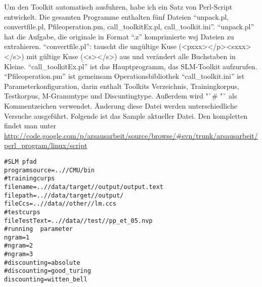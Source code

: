 
Um den Toolkit automatisch ausfuhren, habe ich ein Satz von Perl-Script entwickelt. 
Die gesamten Programme enthalten f\"unf Dateien "`unpack.pl, convertfile.pl, Pfileoperation.pm, call\_toolkitEx.pl, call\_toolkit.ini"'.
"`unpack.pl"' hat die Aufgabe, die originale in Format "`.z"' komprimierte  wsj Dateien zu extrahieren.
"`convertfile.pl"': tauscht die ung\"ultige Kuse (<pxxx></p><sxxx></s>) mit g\"ultige Kuse (<s></s>) aus und ver\"andert alle Buchstaben in Kleine. 
"`call\_toolkitEx.pl"' ist das Hauptprogramm, das SLM-Toolkit aufzurufen. 
"`Pfileoperation.pm"' ist gemeinsam Operationsbibliothek
"`call\_toolkit.ini"' ist Parameterkonfiguration, darin enthalt Toolkits Verzeichnis, Trainingkorpus, Testkorpus, M-Grammtype und Discuntingtype. Au\ss erdem wird  "`\# "`  als Kommentzeichen verwendet. \"Anderung diese Datei werden unterschiedliche Versuche ausgef\"uhrt. Folgende ist das Sample aktueller Datei. Den kompletten findet man unter \url{http://code.google.com/p/arsausarbeit/source/browse/#svn/trunk/arsausarbeit/perl_program/linux/script}\\

\begin{lstlisting}
#SLM pfad 
programsource=..//CMU/bin 
#trainingcurps 
filename=..//data/target//output/output.text 
filepath=..//data/target//output/ 
fileCcs=..//data//other//lm.ccs 
#testcurps 
fileTestText=..//data//test//pp_et_05.nvp 
#running  parameter 
ngram=1 
#ngram=2 
#ngram=3 
#discounting=absolute 
#discounting=good_turing 
discounting=witten_bell 

\end{lstlisting}
